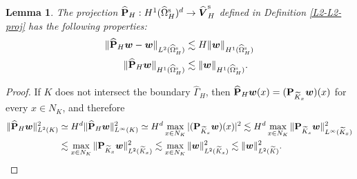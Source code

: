 \documentclass[11pt,reqno]{amsart}
\theoremstyle{definition}
\theoremstyle{plain}
\newtheorem{lemma}{Lemma}[section]
\numberwithin{theorem}{section}
\numberwithin{proposition}{section}
\numberwithin{lemma}{section}
\numberwithin{equation}{section}
\newcommand{\bs}[1]{\boldsymbol{#1}}
\renewcommand{\(}{\bigl(}
\renewcommand{\)}{\bigr)}
\begin{document}
\begin{lemma}\label{Lemma:PH}
The projection $\widehat{\bf P}_H:H^1(\widehat\Omega^{\rm s}_H)^d\rightarrow \widehat{\bs V}^{\rm s}_H$ defined in Definition \ref{L2-L2-proj} has the following properties: 
\begin{align*}
\|\widehat{\bf P}_H{\bs w} - {\bs w}\|_{L^2(\widehat\Omega^{\rm s}_H)}
&\lesssim H\|{\bs w}\|_{H^1(\widehat\Omega^{\rm s}_H)} \\
\|\widehat{\bf P}_H{\bs w}\|_{H^1(\widehat\Omega^{\rm s}_H)}
&\lesssim \|{\bs w}\|_{H^1(\widehat\Omega^{\rm s}_H)} .
\end{align*}
\end{lemma}
\begin{proof}
If $K$ does not intersect the boundary $\widehat\Gamma_H$, then 
$\widehat{\bf P}_H{\bs w}(x) = ({\bf P}_{\widetilde K_x}{\bs w})(x)$ for every $x\in N_K$, and therefore
\begin{align}\label{L2-wH-w}
\|\widehat{\bf P}_H{\bs w}\|_{L^2(K)}^2&
\simeq H^d\|\widehat{\bf P}_H{\bs w}\|_{L^\infty(K)}^2 
\simeq H^d\max_{x\in N_K}|({\bf P}_{\widetilde K_x}{\bs w})(x)|^2 
\lesssim H^d \max_{x\in N_K} \|{\bf P}_{\widetilde K_x}{\bs w}\|_{L^\infty(\widetilde K_x)}^2 \notag\\
&\lesssim \max_{x\in N_K} \|{\bf P}_{\widetilde K_x}{\bs w}\|_{L^2(\widetilde K_x)}^2 
\lesssim \max_{x\in N_K} \|{\bs w}\|_{L^2(\widetilde K_x)}^2  \lesssim \|{\bs w}\|_{L^2(\widetilde K)}^2 . 
\end{align}


\end{proof}
\end{document}
